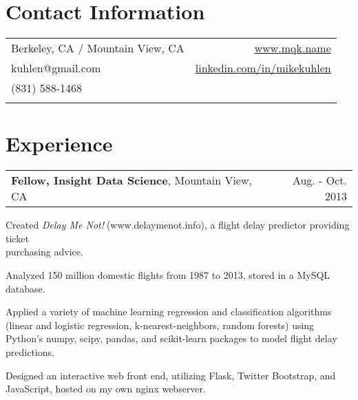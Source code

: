 \begin{resume}

\vspace*{0.15in}

\section{\sc Contact Information}
\vspace*{.05in}
\begin{tabularx}{\textwidth}{Xr}
Berkeley, CA / Mountain View, CA         & \url{www.mqk.name} \\
kuhlen@gmail.com                         & \url{linkedin.com/in/}$\!$\url{mikekuhlen} \\
(831) 588-1468 \\                        & \\
\end{tabularx}

\vspace*{-0.15in}
\section{\sc Experience}
\hspace*{-0.1in}
\begin{tabularx}{1.025\textwidth}{Xr}
\textbf{Fellow, Insight Data Science}, Mountain View, CA & Aug. - Oct. 2013
\end{tabularx}
\vspace*{-0.1in}
\begin{list1}
\item Created \textit{Delay Me Not!}$\;$(www.delaymenot.info), a flight delay predictor providing ticket \\ purchasing advice.
\item Analyzed 150 million domestic flights from 1987 to 2013, stored in a MySQL database.
\item Applied a variety of machine learning regression and classification algorithms (linear and logistic regression, k-nearest-neighbors, random forests) using Python's numpy, scipy, pandas, and scikit-learn packages to model flight delay predictions.
\item Designed an interactive web front end, utilizing Flask, Twitter Bootstrap, and JavaScript, hosted on my own nginx webserver.
\end{list1}


\end{resume}

